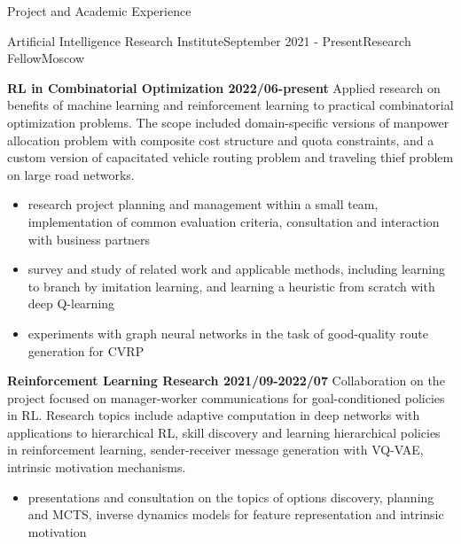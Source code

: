 \documentclass{resume} %
\begin{document}
\begin{rSection}{Project and Academic Experience}

\begin{rSubsection}{Artificial Intelligence Research Institute}{September 2021 - Present}{Research Fellow}{Moscow}
    \bigskip

    \item \textbf{RL in Combinatorial Optimization 2022/06-present}
    Applied research on benefits of machine learning and reinforcement learning to practical
    combinatorial optimization problems. The scope included domain-specific versions of manpower
    allocation problem with composite cost structure and quota constraints, and a custom version
    of capacitated vehicle routing problem and traveling thief problem on large road networks.
    \begin{itemize}
        \item research project planning and management within a small team, implementation
        of common evaluation criteria, consultation and interaction with business partners

        \item survey and study of related work and applicable methods, including learning to
        branch by imitation learning, and learning a heuristic from scratch with deep Q-learning

        \item experiments with graph neural networks in the task of good-quality route
        generation for CVRP
    \end{itemize}

    \medskip
    \item \textbf{Reinforcement Learning Research 2021/09-2022/07}
    Collaboration on the project focused on manager-worker communications for goal-conditioned
    policies in RL.
    Research topics include adaptive computation in deep networks with applications to
    hierarchical RL, skill discovery and learning hierarchical policies in reinforcement
    learning, sender-receiver message generation with VQ-VAE, intrinsic motivation mechanisms.
    \begin{itemize}
        \item presentations and consultation on the topics of options discovery, planning and
        MCTS, inverse dynamics models for feature representation and intrinsic motivation
        

\end{itemize}
\end{rSubsection}
\end{rSection}
\end{document}
